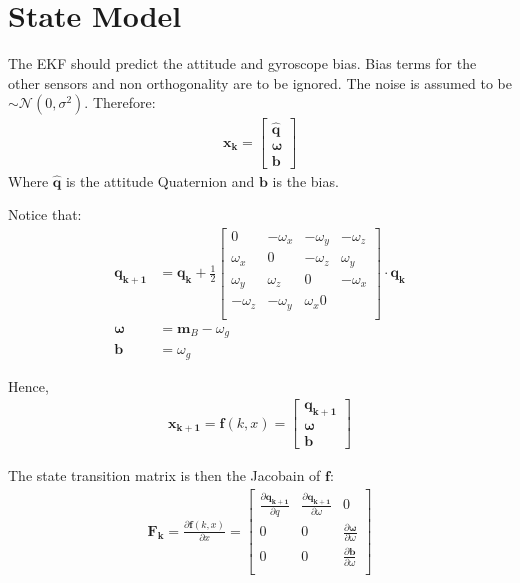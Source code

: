 \documentclass[10pt,a4paper]{article}
\newcommand{\V}[1]{\mathbf{#1}}
\newcommand{\Vh}[1]{\mathbf{\hat{#1}}}
\begin{document}
\section {State Model}
The EKF should predict the attitude and gyroscope bias.
Bias terms for the other sensors and non orthogonality are to be ignored.
The noise is assumed to be $\sim \mathcal{N}(0, \sigma^2)$.
Therefore: 
\begin{align}
  \V {x_k} =
  \begin{bmatrix}
    \Vh q \\ \V \omega \\ \V b
  \end{bmatrix}
\end{align}
Where $\Vh q$ is the attitude Quaternion and $\V b$ is the bias.

Notice that:
\begin{align}
  \V {q_{k+1}} &= \V{q_k} + \frac 1 2
  \begin{bmatrix}
    0 & - \omega_x  & - \omega_y  & - \omega_z  \\ 
    \omega_x  &  0 & - \omega_z  &  \omega_y   \\ 
    \omega_y  &  \omega_z  &  0 & - \omega_x \\ 
    - \omega_z  & - \omega_y  &  \omega_x  0 \\ 
  \end{bmatrix} \cdot \V {q_k} \\ 
  \V \omega &= \V m_B - \omega_g \\
  \V b &= \omega_g
\end{align}

Hence, 
\begin{align}
  \V {x_{k+1}} = \V f (k, x) = 
  \begin{bmatrix}
    \V {q_{k+1}} \\ 
    \V \omega \\
    \V b
  \end{bmatrix}
\end{align}

The state transition matrix is then the Jacobain of $\V f$:
\begin{align}
  \V {F_{k}} =  \frac { \partial \V f (k, x) } {\partial x} = 
  \begin{bmatrix}
    \frac {\partial \V {q_{k+1}}} {\partial q} & \frac {\partial \V {q_{k+1}}} {\partial \omega} & 0 \\ 
    0 & 0 & \frac {\partial \V \omega} {\partial \omega} \\
    0 & 0 & \frac {\partial \V b} {\partial \omega} \\
  \end{bmatrix}
\end{align}
\end{document}
